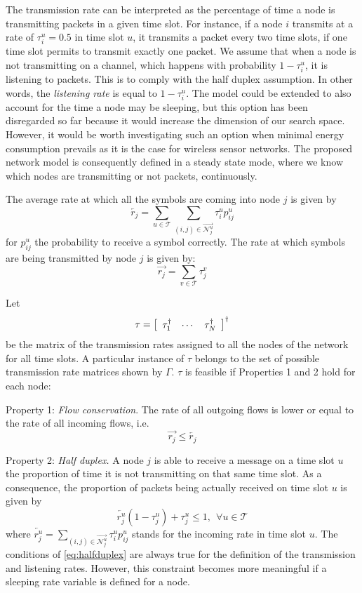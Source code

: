 \documentclass[a4paper]{article}
\newcommand{\T}{\mathcal{T}}
\newcommand{\Nout}[2]{ \overrightarrow{ \mathcal{N}_{#1}^{#2} } }
\begin{document}
The transmission rate can be interpreted as the percentage of time a node is transmitting packets in a given time slot. For instance, if a node $i$ transmits at a rate of $\tau_i^u=0.5$ in time slot $u$, it transmits a packet every two time slots, if one time slot permits to transmit exactly one packet. 
We assume that when a node is not transmitting on a channel, which happens with probability $1-\tau_i^u$, it is listening to packets. This is to comply with the half duplex assumption. In other words, the \emph{listening rate} is equal to $1-\tau_i^u$. The model could be extended to also account for the time a node may be sleeping, but this option has been disregarded so far because it would increase the dimension of our search space. However, it would be worth investigating such an option when minimal energy consumption prevails as it is the case for wireless sensor networks.
The proposed network model is consequently defined in a steady state mode, where we know which nodes are transmitting or not packets, continuously.

The average rate at which all the symbols are coming into node $j$ is given by 
\[ 
\overleftarrow{r_j} = \sum_{u \in \T} \sum_{(i,j) \in \Nout{j}{u}} \tau_i^u p_{ij}^u
\]
for $p_{ij}^u$ the probability to receive a symbol correctly. 
The rate at which symbols are being transmitted by node $j$ is given by: 
\[ 
\overrightarrow{r_j} = \sum_{v \in \T} \tau_j^v
\]

Let \[\tau = \left[ 
 	\begin{array}{c c c}
		\tau_1^\dagger &
		\cdots &
		\tau_N^\dagger \\
 	\end{array}
\right]^{\dagger}
\] be the matrix of the transmission rates assigned to all the nodes of the network for all time slots. A particular instance of $\tau$ belongs to the set of possible transmission rate matrices shown by $\Gamma$.
$\tau$ is feasible if Properties 1 and 2 hold for each node: 

{\sc Property 1:} {\it Flow conservation}.  The rate of all outgoing flows is lower or equal to the rate of all incoming flows, i.e.
\begin{equation}
  \overrightarrow{r_j} \leq \overleftarrow{r_j}  
\label{eq:ratesflowconservation}
\end{equation}  

{\sc Property 2:} {\it Half duplex.} A node $j$ is able to receive a message on a time slot $u$ the proportion of time it is not transmitting on that same time slot. 
As a consequence, the proportion of packets being actually received on time slot $u$ is given by
\begin{equation}
\overleftarrow{r_j^u}(1-\tau_j^u) +  \tau_j^u \leq 1, ~~\forall u \in \T
\label{eq:halfduplex}
\end{equation}  
\noindent where $\overleftarrow{r_j^u} = \sum_{(i,j) \in \Nout{j}{u}} \tau_i^u p_{ij}^u$ stands for the incoming rate in time slot $u$. The conditions of \eqref{eq:halfduplex} are always true for the definition of the transmission and listening rates. However, this constraint becomes more meaningful if a sleeping rate variable is defined for a node. 
  
\end{document}
